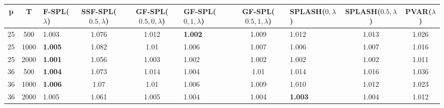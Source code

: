 \begin{tabular}{cclcclclcc}
\hline
  p  &  T   & F-SPL($\lambda$)   &  SSF-SPL($0.5, \lambda$)  &  GF-SPL($0.5, 0, \lambda$)  & GF-SPL($0, 1, \lambda$)   &  GF-SPL($0.5, 1, \lambda$)  & SPLASH($0, \lambda$)   &  SPLASH($0.5, \lambda$)  &  PVAR($\lambda$)  \\
\hline
 25  & 500  & 1.003              &           1.076           &            1.012            & \textbf{1.002}            &            1.009            & 1.012                  &          1.013           &       1.026       \\
 25  & 1000 & \textbf{1.005}     &           1.082           &            1.01             & 1.006                     &            1.007            & 1.006                  &          1.007           &       1.016       \\
 25  & 2000 & \textbf{1.001}     &           1.056           &            1.003            & 1.002                     &            1.002            & 1.002                  &          1.002           &       1.011       \\
 36  & 500  & \textbf{1.004}     &           1.073           &            1.014            & 1.004                     &            1.01             & 1.014                  &          1.016           &       1.036       \\
 36  & 1000 & \textbf{1.006}     &           1.07            &            1.01             & 1.006                     &            1.009            & 1.010                  &          1.012           &       1.023       \\
 36  & 2000 & 1.005              &           1.061           &            1.005            & 1.004                     &            1.004            & \textbf{1.003}         &          1.004           &       1.012       \\
\hline
\end{tabular}
